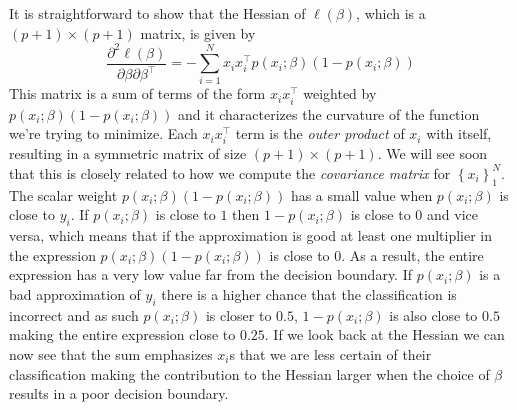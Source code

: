 \documentclass[a4paper]{article}
\begin{document}
It is straightforward to show that the Hessian of $\ell(\beta)$, which is a $(p+1)\times(p+1)$ matrix, is given by
$$
\frac{\partial^2 \ell(\beta)}{\partial \beta\partial \beta^\top} = -\sum_{i=1}^N x_i x_i^\top p(x_i;\beta)\left(1-p(x_i;\beta)\right)
$$
This matrix is a sum of terms of the form $x_i x_i^\top$ weighted by $p(x_i;\beta)(1-p(x_i;\beta))$ and it characterizes the curvature of the function we're trying to minimize. Each $x_i x_i^\top$ term is the \textit{outer product} of $x_i$ with itself, resulting in a symmetric matrix of size $(p+1)\times(p+1)$.  We will see soon that this is closely related to how we compute the \emph{covariance matrix} for $\left\{x_i\right\}_1^N$. The scalar weight $p(x_i;\beta)(1-p(x_i;\beta))$ has a small value when $p(x_i;\beta)$ is close to $y_i$. If $p(x_i;\beta)$ is close to $1$ then $1 - p(x_i;\beta)$ is close to $0$ and vice versa, which means that if the approximation is good at least one multiplier in the expression $p(x_i;\beta)(1-p(x_i;\beta))$ is close to $0$. As a result, the entire expression has a very low value far from the decision boundary. If $p(x_i;\beta)$ is a bad approximation of $y_i$ there is a higher chance that the classification is incorrect and as such $p(x_i;\beta)$ is closer to $0.5$, $1 - p(x_i;\beta)$ is also close to $0.5$ making the entire expression close to $0.25$. If we look back at the Hessian we can now see that the sum emphasizes $x_i$s that we are less certain of their classification making the contribution to the Hessian  larger when the choice of $\beta$ results in a poor decision boundary. 
\end{document}
